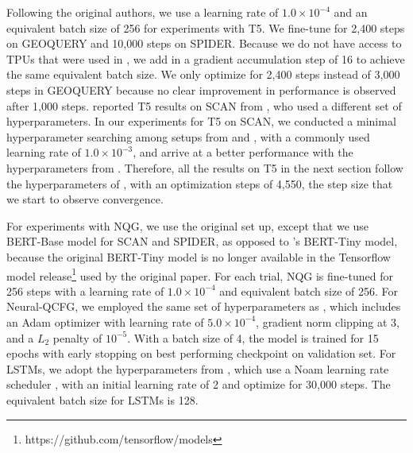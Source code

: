 Following the original authors, we use a learning rate of $1.0 \times 10^{-4}$ and an equivalent batch size of 256 for experiments with T5.
We fine-tune for 2,400 steps on GEOQUERY and 10,000 steps on SPIDER. 
Because we do not have access to TPUs that were used in \cite{shaw-etal-2021-compositional}, we add in a gradient accumulation step of 16 to achieve the same equivalent batch size. We only optimize for 2,400 steps instead of 3,000 steps in GEOQUERY because no clear improvement in performance is observed after 1,000 steps. 
\cite{shaw-etal-2021-compositional} reported T5 results on SCAN from \cite{keysers2020measuring}, who used a different set of hyperparameters. 
In our experiments for T5 on SCAN, we conducted a minimal hyperparameter searching among setups from \cite{keysers2020measuring} and \cite{shaw-etal-2021-compositional}, with a commonly used learning rate of $1.0 \times 10^{-3}$, and arrive at a better performance with the hyperparameters from \cite{shaw-etal-2021-compositional}. 
Therefore, all the results on T5 in the next section follow the hyperparameters of \cite{shaw-etal-2021-compositional}, with an optimization steps of 4,550, the step size that we start to observe convergence.

For experiments with NQG, we use the original set up, except that we use BERT-Base model for SCAN and SPIDER, as opposed to \cite{shaw-etal-2021-compositional}'s BERT-Tiny model, because
the original BERT-Tiny model is no longer available in the Tensorflow model release\footnote{https://github.com/tensorflow/models} used by the original paper. 
For each trial, NQG is fine-tuned for 256 steps with a learning rate of $1.0 \times 10^{-4}$ and equivalent batch size of 256.
% 
For Neural-QCFG, we employed the same set of hyperparameters as \cite{kim2021sequencetosequence}, which includes an Adam optimizer \cite{kingma-ba-2015-adam} with learning rate of $5.0 \times 10^{-4}$, gradient norm clipping at 3, and a $L_2$ penalty of $10^{-5}$. 
With a batch size of 4, the model is trained for 15 epochs with early stopping on best performing checkpoint on validation set.
% 
For LSTMs, we adopt the hyperparameters from \cite{kim-linzen-2020-cogs}, which use a Noam learning rate scheduler \cite{vaswani2017attention}, with an initial learning rate of 2 and optimize for 30,000 steps. The equivalent batch size for LSTMs is 128.

\vspace{-3mm}
